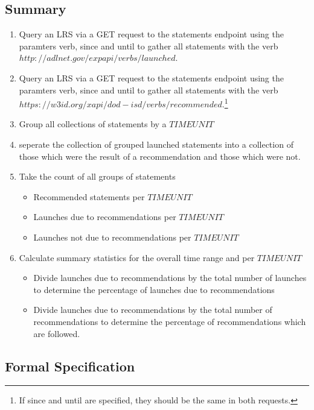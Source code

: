 \documentclass{article}
\begin{document}
\subsection{Summary}
\begin{enumerate}
  \item Query an LRS via a GET request to the statements endpoint
    using the paramters verb, since and until to gather all statements
    with the verb $http://adlnet.gov/expapi/verbs/launched$.
  \item Query an LRS via a GET request to the statements endpoint
    using the paramters verb, since and until to gather all statements
    with the verb $https://w3id.org/xapi/dod-isd/verbs/recommended$.\footnote{\label{sameSession} If since and until are specified,
      they should be the same in both requests.}
  \item Group all collections of statements by a $TIMEUNIT$
  \item seperate the collection of grouped launched statements into a
    collection of those which were the result of a recommendation and
    those which were not.
  \item Take the count of all groups of statements
    \begin{itemize}
    \item Recommended statements per $TIMEUNIT$
    \item Launches due to recommendations per $TIMEUNIT$
    \item Launches not due to recommendations per $TIMEUNIT$
    \end{itemize}
  \item Calculate summary statistics for the overall time range and
    per $TIMEUNIT$
    \begin{itemize}
    \item Divide launches due to recommendations by the total number of
      launches to determine the percentage of launches due to
      recommendations
    \item Divide launches due to recommendations by the total number
      of recommendations to determine the percentage of
      recommendations which are followed.
    \end{itemize}
\end{enumerate}

\subsection{Formal Specification}
\end{document}
